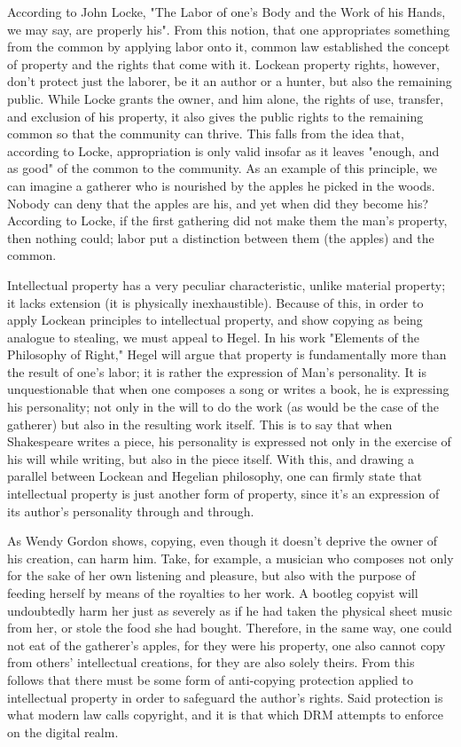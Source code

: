 \documentclass[12pt]{article}
\begin{document}
According to John Locke, "The Labor of one's Body and the Work of his Hands, we may say, are properly his"\cite[p.287]{locke}. From this notion, that one appropriates something from the common by applying labor onto it, common law established the concept of property and the rights that come with it. Lockean property rights, however, don't protect just the laborer, be it an author or a hunter, but also the remaining public. While Locke grants the owner, and him alone, the rights of use, transfer, and exclusion of his property, it also gives the public rights to the remaining common so that the community can thrive\cite[p.119]{favale}. This falls from the idea that, according to Locke, appropriation is only valid insofar as it leaves "enough, and as good"\cite[p.291]{locke} of the common to the community. As an example of this principle, we can imagine a gatherer who is nourished by the apples he picked in the woods. Nobody can deny that the apples are his, and yet when did they become his? According to Locke, if the first gathering did not make them the man's property, then nothing could; labor put a distinction between them (the apples) and the common\cite[p.288]{locke}.

Intellectual property has a very peculiar characteristic, unlike material property; it lacks extension (it is physically inexhaustible). Because of this, in order to apply Lockean principles to intellectual property, and show copying as being analogue to stealing, we must appeal to Hegel. In his work "Elements of the Philosophy of Right," Hegel will argue that property is fundamentally more than the result of one's labor; it is rather the expression of Man's personality\cite[p.84-88]{hegel}. It is unquestionable that when one composes a song or writes a book, he is expressing his personality; not only in the will to do the work (as would be the case of the gatherer) but also in the resulting work itself. This is to say that when Shakespeare writes a piece, his personality is expressed not only in the exercise of his will while writing, but also in the piece itself. With this, and drawing a parallel between Lockean and Hegelian philosophy, one can firmly state that intellectual property is just another form of property, since it's an expression of its author's personality through and through.

As Wendy Gordon shows, copying, even though it doesn't deprive the owner of his creation, can harm him. Take, for example, a musician who composes not only for the sake of her own listening and pleasure, but also with the purpose of feeding herself by means of the royalties to her work. A bootleg copyist will undoubtedly harm her just as severely as if he had taken the physical sheet music from her, or stole the food she had bought\cite[p.1548]{gordon}. Therefore, in the same way, one could not eat of the gatherer's apples, for they were his property, one also cannot copy from others' intellectual creations, for they are also solely theirs. From this follows that there must be some form of anti-copying protection applied to intellectual property in order to safeguard the author's rights. Said protection is what modern law calls copyright, and it is that which DRM attempts to enforce on the digital realm.
\end{document}
